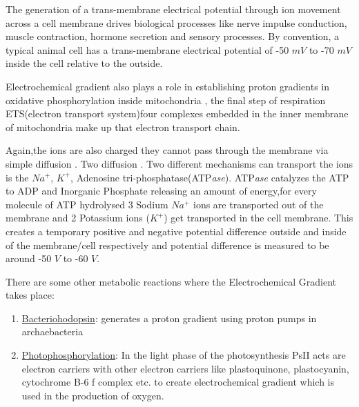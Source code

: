 \documentclass[11pt]{scrartcl}
\begin{document}
		The generation of a trans-membrane electrical potential through ion movement across a cell membrane drives biological processes like nerve impulse conduction, muscle  contraction, hormone secretion and sensory processes. By convention, a typical animal cell has a trans-membrane electrical potential of -50 $mV$ to -70 $mV$ inside the cell relative to the outside.
		
		Electrochemical gradient also plays a role in establishing proton gradients in oxidative phosphorylation inside mitochondria , the final step of respiration ETS(electron transport system)four complexes embedded in the inner membrane of mitochondria make up that electron transport chain.
		
		Again,the ions are also charged they cannot pass through the membrane via simple diffusion . Two diffusion . Two different mechanisms can transport the ions is the $Na^{+}$, $K^{+}$, Adenosine tri-phosphatase(ATP\emph{ase}). ATP\emph{ase} catalyzes the ATP to ADP and Inorganic Phosphate releasing an amount of energy,for every molecule of ATP hydrolysed 3 Sodium $Na^{+}$ ions are transported out of the membrane and 2 Potassium ions ($K^{+}$) get transported in the cell membrane. This creates a temporary positive and negative potential difference outside and inside of the membrane/cell respectively and potential difference is measured to be around -50 $V$ to -60 $V$.
		
		There are some other metabolic reactions where the Electrochemical Gradient takes place:
		
		\begin{enumerate}
			\item \underline{Bacteriohodopsin}: generates a proton gradient using proton pumps in archaebacteria 
			
			\item \underline{Photophosphorylation}: In the light phase of the photosynthesis PsII acts are electron carriers with other electron carriers like plastoquinone, plastocyanin, cytochrome B-6 f complex etc. to create electrochemical gradient which is used in the production of oxygen.
		\end{enumerate}
	
	\pagebreak
		
		
		
\end{document}
